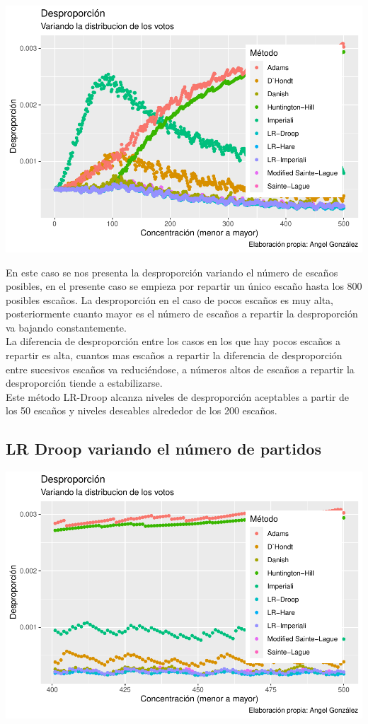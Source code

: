 \documentclass[12pt,a4paper,]{book}
\numberwithin{dummy}{section}
\theoremstyle{ocrenumbox}
\theoremstyle{blacknumex}
\theoremstyle{blacknumbox}
\theoremstyle{ocrenum}
\theoremstyle{ocrenum}
\begin{document}
\begin{center}\includegraphics[width=0.95\linewidth]{figurasR/unnamed-chunk-58-1} \end{center}

En este caso se nos presenta la desproporción variando el número de
escaños posibles, en el presente caso se empieza por repartir un único
escaño hasta los 800 posibles escaños. La desproporción en el caso de
pocos escaños es muy alta, posteriormente cuanto mayor es el número de
escaños a repartir la desproporción va bajando constantemente.\\
La diferencia de desproporción entre los casos en los que hay pocos
escaños a repartir es alta, cuantos mas escaños a repartir la diferencia
de desproporción entre sucesivos escaños va reduciéndose, a números
altos de escaños a repartir la desproporción tiende a estabilizarse.\\
Este método LR-Droop alcanza niveles de desproporción aceptables a
partir de los 50 escaños y niveles deseables alrededor de los 200
escaños.

\hypertarget{lr-droop-variando-el-nuxfamero-de-partidos}{%
\subsection{LR Droop variando el número de
partidos}\label{lr-droop-variando-el-nuxfamero-de-partidos}}

\begin{center}\includegraphics[width=0.95\linewidth]{figurasR/unnamed-chunk-59-1} \end{center}
\end{document}
